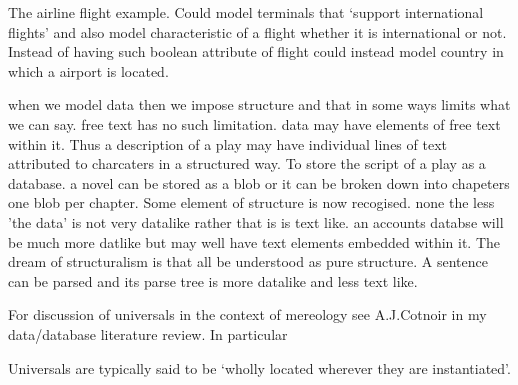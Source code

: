 \begin{noteforfuture}
 The airline flight example. Could model terminals that `support international flights' and also
 model characteristic of a flight whether it is international or not. Instead of having such boolean attribute of flight could instead model country in which a airport is located. 
\end{noteforfuture}

\begin{noteforfuture}
when we model data then we impose structure and that in some ways limits what we can say.
free text has no such limitation.
data may have elements of free text within it. Thus a description of a play may have individual lines of text attributed to charcaters in a structured way. To store the script of a play as a database. a novel can be stored as a blob or it can be broken down into chapeters one blob per chapter. Some element of structure is now recogised. none the less 'the data' is not very datalike rather that is is text like. an accounts databse will be much more datlike but may well have text elements embedded within it. The dream of structuralism is that all be understood as pure structure. A sentence can be parsed and its parse tree is more datalike and less text like.
\end{noteforfuture}

\begin{noteforfuture}
For discussion of universals in  the context of mereology see A.J.Cotnoir in my data/database literature review. In particular
\begin{erquote}
Universals are typically said to be ‘wholly located wherever they are instantiated’.
\end{erquote}
\end{noteforfuture}

